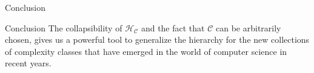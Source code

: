         \begin{frame}{Conclusion}
            \begin{block}{Conclusion}
                The collapsibility of $\mathcal{H}_{\mathcal{C}}$ and the fact that $\mathcal{C}$ 
                can be arbitrarily chosen, gives us a powerful tool to generalize the hierarchy for 
                the new collections of complexity classes that have emerged in the world of computer science in 
                recent years.
            \end{block}
        \end{frame}


